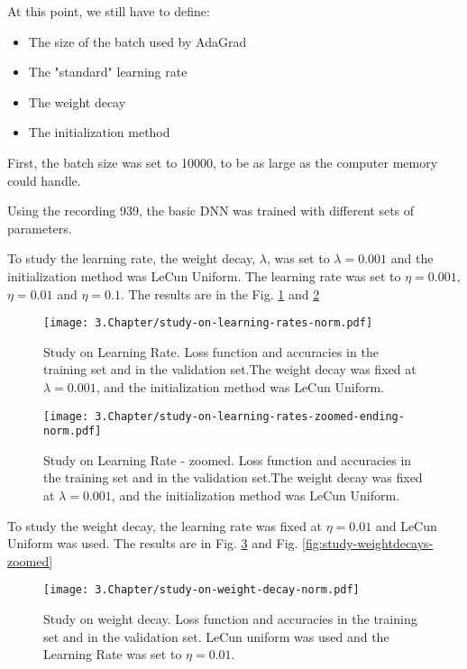 At this point, we still have to define:
\begin{itemize}
\item The size of the batch used by AdaGrad
\item The "standard" learning rate
\item The weight decay
\item The initialization method
\end{itemize}

First, the batch size was set to 10000, to be as large as the computer memory could handle.

Using the recording 939, the basic DNN was trained with different sets of parameters. 


To study the learning rate, the weight decay, $\lambda$, was set to $\lambda = 0.001$ and the initialization method was LeCun Uniform. The learning rate was set to $\eta = 0.001$, $\eta = 0.01$ and $\eta = 0.1$. The results are in the Fig. \ref{fig:study-LR} and \ref{fig:study-LR-zoomed}

\begin{figure}[htb]
	\centering
	\texttt{[image: 3.Chapter/study-on-learning-rates-norm.pdf]}
	\caption{Study on Learning Rate. Loss function and accuracies in the training set and in the validation set.The weight decay was fixed at $\lambda = 0.001$, and the initialization method was LeCun Uniform.
}
\label{fig:study-LR}
\end{figure}

\begin{figure}[htb]
	\centering
	\texttt{[image: 3.Chapter/study-on-learning-rates-zoomed-ending-norm.pdf]}
	\caption{Study on Learning Rate - zoomed. Loss function and accuracies in the training set and in the validation set.The weight decay was fixed at $\lambda = 0.001$, and the initialization method was LeCun Uniform.
}
\label{fig:study-LR-zoomed}
\end{figure}

To study the weight decay, the learning rate was fixed at $\eta = 0.01$ and LeCun Uniform was used. The results are in Fig. \ref{fig:study-weightdecays} and Fig. \ref{fig:study-weightdecays-zoomed}

\begin{figure}[htb]
	\centering
	\texttt{[image: 3.Chapter/study-on-weight-decay-norm.pdf]}
	\caption{Study on weight decay. Loss function and accuracies in the training set and in the validation set. LeCun uniform was used and the Learning Rate was set to $\eta = 0.01$.
}
\label{fig:study-weightdecays}
\end{figure}

